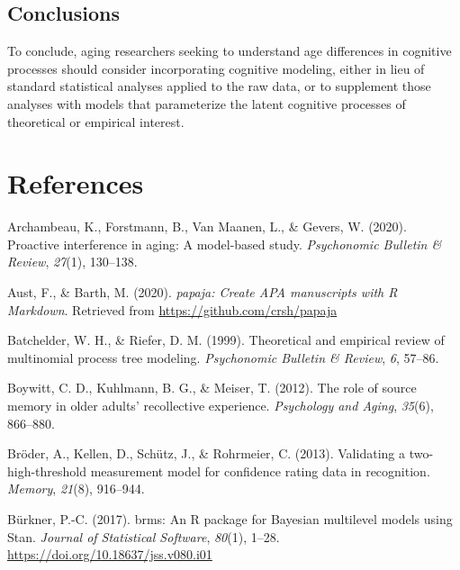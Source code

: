 \documentclass[
  english,
  ,man,floatsintext]{apa6}
\begin{document}
\hypertarget{conclusions}{%
\subsection{Conclusions}\label{conclusions}}

To conclude, aging researchers seeking to understand age differences in cognitive processes should consider incorporating cognitive modeling, either in lieu of standard statistical analyses applied to the raw data, or to supplement those analyses with models that parameterize the latent cognitive processes of theoretical or empirical interest.

\hypertarget{references}{%
\section{References}\label{references}}

\setlength{\parindent}{-0.5in}
\setlength{\leftskip}{0.5in}

\hypertarget{refs}{}
\leavevmode\hypertarget{ref-archambeau2020proactive}{}%
Archambeau, K., Forstmann, B., Van Maanen, L., \& Gevers, W. (2020). Proactive interference in aging: A model-based study. \emph{Psychonomic Bulletin \& Review}, \emph{27}(1), 130--138.

\leavevmode\hypertarget{ref-R-papaja}{}%
Aust, F., \& Barth, M. (2020). \emph{papaja: Create APA manuscripts with R Markdown}. Retrieved from \url{https://github.com/crsh/papaja}

\leavevmode\hypertarget{ref-BatchelderAndRiefer1999}{}%
Batchelder, W. H., \& Riefer, D. M. (1999). Theoretical and empirical review of multinomial process tree modeling. \emph{Psychonomic Bulletin \& Review}, \emph{6}, 57--86.

\leavevmode\hypertarget{ref-BoywittEtAl2012}{}%
Boywitt, C. D., Kuhlmann, B. G., \& Meiser, T. (2012). The role of source memory in older adults' recollective experience. \emph{Psychology and Aging}, \emph{35}(6), 866--880.

\leavevmode\hypertarget{ref-BroderEtAl2013}{}%
Bröder, A., Kellen, D., Schütz, J., \& Rohrmeier, C. (2013). Validating a two-high-threshold measurement model for confidence rating data in recognition. \emph{Memory}, \emph{21}(8), 916--944.

\leavevmode\hypertarget{ref-brms}{}%
Bürkner, P.-C. (2017). brms: An R package for Bayesian multilevel models using Stan. \emph{Journal of Statistical Software}, \emph{80}(1), 1--28. \url{https://doi.org/10.18637/jss.v080.i01}
\end{document}
